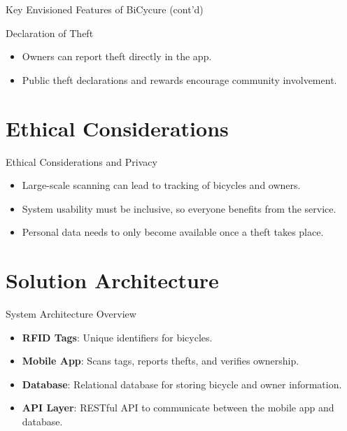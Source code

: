\documentclass{beamer}
\begin{document}
\begin{frame}{Key Envisioned Features of BiCycure (cont'd)}
    \begin{block}{Declaration of Theft}
        \begin{itemize}
            \item Owners can report theft directly in the app.
            \item Public theft declarations and rewards encourage community involvement.
        \end{itemize}
    \end{block}
\end{frame}


\section{Ethical Considerations}
\begin{frame}{Ethical Considerations and Privacy}
    \begin{itemize}
        \item Large-scale scanning can lead to tracking of bicycles and owners.
        \item System usability must be inclusive, so everyone benefits from the service.
        \item Personal data needs to only become available once a theft takes place.
    \end{itemize}
\end{frame}

\section{Solution Architecture}
\begin{frame}{System Architecture Overview}
    \begin{itemize}
        \item \textbf{RFID Tags}: Unique identifiers for bicycles.
        \item \textbf{Mobile App}: Scans tags, reports thefts, and verifies ownership.
        \item \textbf{Database}: Relational database for storing bicycle and owner information.
        \item \textbf{API Layer}: RESTful API to communicate between the mobile app and database.
    \end{itemize}
\end{frame}
\end{document}
